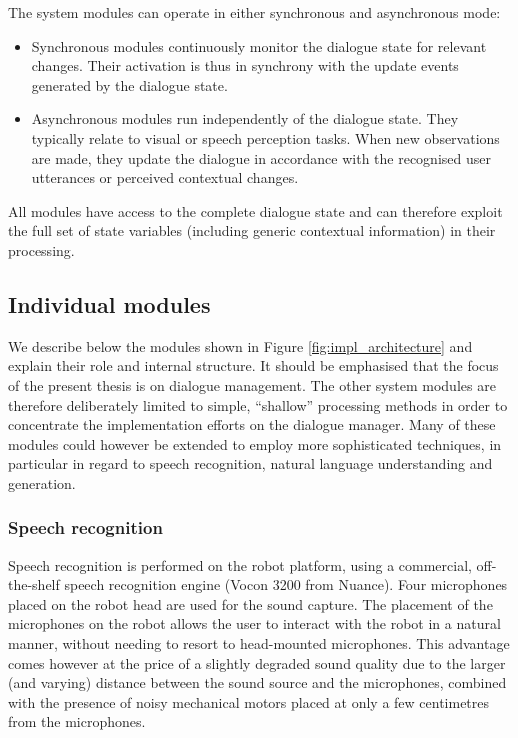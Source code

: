 The system modules can operate in either synchronous and asynchronous mode: \begin{itemize}
\item Synchronous modules continuously monitor the dialogue state for relevant changes.  Their activation is thus in synchrony with the update events generated by the dialogue state.
\item Asynchronous modules run independently of the dialogue state.  They typically relate to visual or speech perception tasks. When new observations are made, they update the dialogue in accordance with the recognised user utterances or perceived contextual changes.

\end{itemize}

All modules have access to the complete dialogue state and can therefore exploit the full set of state variables (including generic contextual information) in their processing. 

\subsection{Individual modules}

We describe below the modules shown in Figure \ref{fig:impl_architecture} and explain their role and internal structure. It should be emphasised that the focus of the present thesis is on dialogue management.  The other system modules are therefore deliberately limited to simple, ``shallow'' processing methods in order to concentrate the implementation efforts on the dialogue manager. Many of these modules could however be extended to employ more sophisticated techniques, in particular in regard to speech recognition, natural language understanding and generation. 

\subsubsection*{Speech recognition}

Speech recognition is performed on the robot platform, using a commercial, off-the-shelf speech recognition engine (Vocon 3200 from Nuance).  Four microphones placed on the robot head are used for the sound capture.  The placement of the microphones on the robot allows the user to interact with the robot in a natural manner, without needing to resort to head-mounted microphones. This advantage comes however at the price of a slightly degraded sound quality due to the larger (and varying) distance between the sound source and the microphones, combined with the presence of noisy mechanical motors placed at only a few centimetres from the microphones. 

